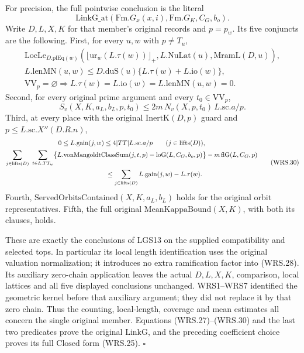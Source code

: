 \documentclass[11pt,a4paper]{article}
\numberwithin{equation}{section}
\theoremstyle{remark}\newtheorem{remark}[theorem]{Remark}
\begin{document}
For precision, the full pointwise conclusion is the literal
\[
 \mathrm{LinkG\_\allowbreak at}(\mathrm{Fm}.G_x(x,i),\mathrm{Fm}.G_K,C_G,b_o).
\]
Write \(D,L,X,K\) for that member's original records and
\(p=p_w\).  Its five conjuncts are the following.
First, for every \(u,w\) with \(p\ne T_u\),
\[
 \begin{gathered}
 \mathrm{LocLe}_{D.\mathrm{plEq}(w)}
    (\lfloor\mathrm{ur}_w(L.\tau(w))\rfloor_+,
          L.\mathrm{NuLat}(u),\mathrm{MramL}(D,u)),\\
 L.\mathrm{lenMN}(u,w)
       \le D.\mathrm{duS}(u)\{L.\tau(w)+L.\mathrm{io}(w)\},\\
 \mathrm{VV}_{p}=\varnothing\Longrightarrow
       L.\tau(w)=L.\mathrm{io}(w)=L.\mathrm{lenMN}(u,w)=0.
 \end{gathered}                                                   \tag{WRS.28}
\]
Second, for every original prime argument and every
\(t_0\in\mathrm{VV}_{p}\),
\[
 S_v(X,K,a_L,b_L,p,t_0)
      \le 2m\,N_v(X,p,t_0)\,L.\mathrm{sc}.a/p.
 \tag{WRS.29}
\]
Third, at every place with the original \(\mathrm{InertK}(D,p)\)
guard and \(p\le L.\mathrm{sc}.X''(D.R.n)\),
\[
 \begin{gathered}
 0\le L.\mathrm{gain}(j,w)
       \le4|TT|L.\mathrm{sc}.a/p
       \qquad(j\in\mathrm{lifts}(D)),\\
 \sum_{j\in\mathrm{lifts}(D)}\ \sum_{t\in L.TT_w}
   \bigl\{L.\mathrm{vonMangoldtClassSum}(j,t,p)
                  -\mathrm{loG}(L,C_G,b_o,p)\bigr\}
       -m\,\mathrm{flG}(L,C_G,p)\\
 \hspace{25mm}\le
       \sum_{j\in\mathrm{lifts}(D)}L.\mathrm{gain}(j,w)-L.\tau(w).
 \end{gathered}                                                   \tag{WRS.30}
\]
Fourth, \(\mathrm{ServedOrbitsContained}(X,K,a_L,b_L)\) holds
for the original orbit representatives.  Fifth, the full original
\(\mathrm{MeanKappaBound}(X,K)\), with both its clauses, holds.

These are exactly the conclusions of LGS13 on the supplied
compatibility and selected tops.  In particular its local length
identification uses the original valuation normalization; it
introduces no extra ramification factor into (WRS.28).  Its
auxiliary zero-chain application leaves the actual \(D,L,X,K\),
comparison, local lattices and all five displayed conclusions
unchanged.  WRS1--WRS7 identified the geometric kernel before
that auxiliary argument; they did not replace it by that zero chain.
Thus the counting, local-length, coverage and mean estimates all
concern the single original member.  Equations (WRS.27)--(WRS.30)
and the last two predicates prove the original \(\mathrm{LinkG}\),
and the preceding coefficient choice proves its full \(\mathrm{Closed}\)
form (WRS.25).
\hfill\(\square\)
\end{document}

